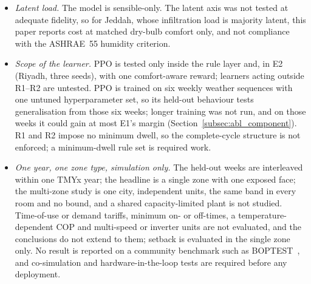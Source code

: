 \documentclass[3p,twocolumn,number]{elsarticle}
\begin{document}
\begin{itemize}[leftmargin=*,itemsep=1pt,topsep=2pt]
between arms: along the guard family a $0.01\,$K warmer mean is worth about $1.3$ points, so the $3$-point resolution rule corresponds to about $0.02\,$K, below Rule~A's $0.03\,$K tolerance. Arms whose $\Delta\tilde T$ differs by more than about $0.02\,$K, including those fitted at the $0.10\,$K fallback, are compared with that caveat. The admission rule itself matters: refitting under a per-window $0.03\,$K criterion moves TUNED by up to $8.4$ points and reverses F4 in Taif (Supplementary Table~S2); the MPC arms were not refitted under it, so the robustness of F2 and F3 to the admission rule is untested. Where the $\lambda$ device cannot reach the matched comfort level, MPC is matched by backing off its occupied ceiling, and a negative saving there is a finding about the device, not a failure of the protocol.
\item \emph{Latent load.} The model is sensible-only. The latent axis was not
tested at adequate fidelity, so for Jeddah, whose infiltration load is majority latent, this paper reports cost at matched dry-bulb comfort only, and not compliance with the ASHRAE~55 humidity criterion.
\item \emph{Scope of the learner.} PPO is tested only inside the rule layer and,
in E2 (Riyadh, three seeds), with one comfort-aware reward; learners acting outside R1--R2 are untested. PPO is trained on six weekly weather sequences with one untuned hyperparameter set, so its held-out behaviour tests generalisation from those six weeks; longer training was not run, and on those weeks it could gain at most E1's margin (Section~\ref{subsec:abl_component}). R1 and R2 impose no minimum dwell, so the complete-cycle structure is not enforced; a minimum-dwell rule set is required work.
\item \emph{One year, one zone type, simulation only.} The held-out weeks are
interleaved within one TMYx year; the headline is a single zone with one exposed face; the multi-zone study is one city, independent units, the same band in every room and no bound, and a shared capacity-limited plant is not studied. Time-of-use or demand tariffs, minimum on- or off-times, a temperature-dependent COP and multi-speed or inverter units are not evaluated, and the conclusions do not extend to them; setback is evaluated in the single zone only. No result is reported on a community benchmark such as BOPTEST~\cite{Blum2021}, and co-simulation and hardware-in-the-loop tests are required before any deployment.
\end{itemize}
\end{document}
